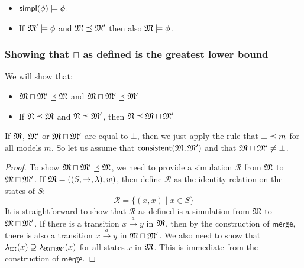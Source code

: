 \begin{itemize}

\item $\mathsf{simpl}(\phi) \models \phi$.

\item If $\frak{M}' \models \phi$ and  $\frak{M} \preceq \frak{M}'$ then also  $\frak{M} \models \phi$.
 
\end{itemize}

\subsubsection{Showing that $\sqcap$ as defined is the greatest lower bound}
We will show that:
\begin{itemize}
\item
$\frak{M} \sqcap \frak{M}' \preceq \frak{M}$ and $\frak{M} \sqcap \frak{M}' \preceq \frak{M}'$
\item
If $\frak{N} \preceq \frak{M}$ and $\frak{N} \preceq \frak{M}'$, then $\frak{N} \preceq \frak{M} \sqcap \frak{M}'$
\end{itemize}
If $\frak{M}$, $ \frak{M}'$ or $\frak{M} \sqcap \frak{M}'$ are equal to $\bot$, then we just apply the rule that $\bot \preceq m$ for all models $m$. 
So let us assume that $\mathsf{consistent}(\frak{M}, \frak{M}')$ and that $\frak{M} \sqcap \frak{M}'  \neq \bot$.

\begin{proof}
To show $\frak{M} \sqcap \frak{M}' \preceq \frak{M}$, we need to provide a simulation $\mathcal{R}$ from $\frak{M}$ to  $\frak{M} \sqcap \frak{M}'$.
If $\frak{M} = ((S,\rightarrow,\lambda),w)$, then define $\mathcal{R}$ as the identity relation on the states of $S$:
\[
\mathcal{R} = \{(x,x) \; | \; x \in S\}
\]
It is straightforward to show that $\mathcal{R}$ as defined is a simulation from $\frak{M}$ to  $\frak{M} \sqcap \frak{M}'$.
If there is a transition $x \xrightarrow{a} y$ in $\frak{M}$, then by the construction of $\mathsf{merge}$, there is also a transition $x \xrightarrow{a} y$ in $\frak{M} \sqcap \frak{M}'$.
We also need to show that $\lambda_{\frak{M}}(x) \supseteq \lambda_{\frak{M} \sqcap \frak{M}'}(x)$ for all states $x$ in $\frak{M}$. This is immediate from the construction of $\mathsf{merge}$.

\end{proof}

